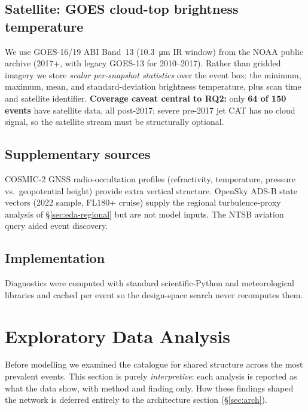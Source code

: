 \documentclass[11pt]{article}
\begin{document}
\subsection{Satellite: GOES cloud-top brightness temperature}
We use GOES-16/19 ABI Band~13 (\SI{10.3}{\micro\metre} IR window) from
the NOAA public archive (2017+, with legacy GOES-13 for 2010--2017).
Rather than gridded imagery we store \emph{scalar per-snapshot
statistics} over the event box: the minimum, maximum, mean, and
standard-deviation brightness temperature, plus scan time and satellite
identifier. \textbf{Coverage caveat central to RQ2:} only \textbf{64 of
150 events} have satellite data, all post-2017; severe pre-2017 jet CAT
has no cloud signal, so the satellite stream must be structurally
optional.

\subsection{Supplementary sources}
COSMIC-2 GNSS radio-occultation profiles (refractivity, temperature,
pressure vs.\ geopotential height) provide extra vertical structure.
OpenSky ADS-B state vectors (2022 sample, FL180+ cruise) supply the
regional turbulence-proxy analysis of \S\ref{sec:eda-regional} but are
not model inputs. The NTSB aviation query aided event discovery.

\subsection{Implementation}
Diagnostics were computed with standard scientific-Python and
meteorological libraries and cached per event so the design-space search
never recomputes them.

\section{Exploratory Data Analysis}
\label{sec:eda}
Before modelling we examined the catalogue for shared structure across
the most prevalent events. This section is purely \emph{interpretive}:
each analysis is reported as what the data show, with method and finding
only. How these findings shaped the network is deferred entirely to the
architecture section (\S\ref{sec:arch}).
\end{document}
